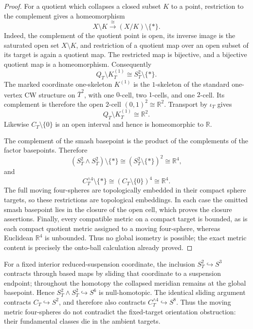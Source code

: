 \begin{proof}
For a quotient which collapses a closed subset \(K\) to a point, restriction
to the complement gives a homeomorphism
\[
 X\setminus K\xrightarrow{\ \cong\ }(X/K)\setminus\{*\}.
\]
Indeed, the complement of the quotient point is open, its inverse image is
the saturated open set \(X\setminus K\), and restriction of a quotient map
over an open subset of its target is again a quotient map.  The restricted
map is bijective, and a bijective quotient map is a homeomorphism.
Consequently
\[
 Q_T\setminus K_T^{(1)}
 \cong S_T^2\setminus\{*\}.
\]
The marked coordinate one-skeleton \(K^{(1)}\) is the \(1\)-skeleton of the
standard one-vertex CW structure on \(\overline T^2\), with one \(0\)-cell,
two \(1\)-cells, and one \(2\)-cell.  Its complement is therefore the open
\(2\)-cell \((0,1)^2\cong\mathbb R^2\).  Transport by
\(\iota_T\) gives
\[
 Q_T\setminus K_T^{(1)}\cong\mathbb R^2.
\]
Likewise \(C_T\setminus\{0\}\) is an open interval and hence is homeomorphic
to \(\mathbb R\).

The complement of the smash basepoint is the product of the complements of
the factor basepoints.  Therefore
\[
 (S_T^2\wedge S_T^2)\setminus\{*\}
 \cong(S_T^2\setminus\{*\})^2\cong\mathbb R^4,
\]
and
\[
 C_T^{\wedge4}\setminus\{*\}
 \cong(C_T\setminus\{0\})^4\cong\mathbb R^4.
\]
The full moving four-spheres are topologically embedded in their compact
sphere targets, so these restrictions are topological embeddings.  In each
case the omitted smash basepoint lies in the closure of the open cell, which
proves the closure assertions.  Finally, every compatible metric on a
compact target is bounded, as is each compact quotient metric assigned to a
moving four-sphere, whereas Euclidean \(\mathbb R^4\) is unbounded.  Thus no
global isometry is possible; the exact metric content is precisely the
onto-ball calculation already proved.
\end{proof}

\begin{remark}
\label{cusp-cone-moving-S4-null-homotopy}
For a fixed interior reduced-suspension coordinate, the inclusion
\(S_T^2\hookrightarrow S^3\) contracts through based maps by sliding that
coordinate to a suspension endpoint; throughout the homotopy the collapsed
meridian remains at the global basepoint.  Hence
\(S_T^2\wedge S_T^2\hookrightarrow S^6\) is null-homotopic.  The identical
sliding argument contracts \(C_T\hookrightarrow S^2\), and therefore also
contracts \(C_T^{\wedge4}\hookrightarrow S^8\).  Thus the moving metric
four-spheres do not contradict the fixed-target orientation obstruction:
their fundamental classes die in the ambient targets.
\end{remark}

